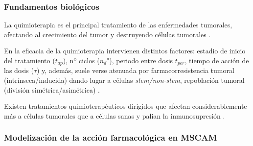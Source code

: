 \subsubsection{Fundamentos biológicos}


La quimioterapia es el principal tratamiento de las enfermedades tumorales, afectando al crecimiento del tumor y destruyendo células tumorales \cite{Honore2015, Miller2019, Capozzi2020}.

En la eficacia de la quimioterapia intervienen distintos factores: estadio de inicio del tratamiento ($t_{ap}$), nº ciclos ($n_d$"), periodo entre dosis $t_{per}$, tiempo de acción de las dosis ($\tau$) y, además, suele verse atenuada por farmacorresistencia tumoral (intrínseca/inducida) dando lugar a células \textit{stem/non-stem}, repoblación tumoral
(división simétrica/asimétrica) \cite{Birkhead1987, Marcu2005, Marcu2012}. 

Existen tratamientos quimioterapéuticos dirigidos que afectan considerablemente más a células tumorales que a células sanas y palian la inmunosupresión \cite{Sun2016}. 




\subsubsection{Modelización de la acción farmacológica en MSCAM}

